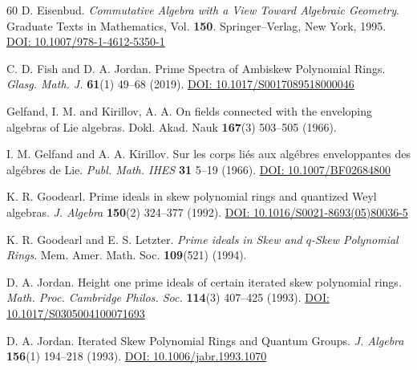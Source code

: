 \documentclass{amsart}
\theoremstyle{definition}
\theoremstyle{remark}
\numberwithin{equation}{section}
\begin{document}
\begin{thebibliography}{60}
 D. Eisenbud. {\em Commutative Algebra with a View Toward Algebraic Geometry}. Graduate Texts in Mathematics, Vol. {\bf 150}. Springer--Verlag, New York, 1995. \href{https://doi.org/10.1007/978-1-4612-5350-1}{DOI: 10.1007/978-1-4612-5350-1}


 C. D. Fish and D. A. Jordan. Prime Spectra of Ambiskew Polynomial Rings. {\em Glasg. Math. J.} {\bf 61}(1) 49--68 (2019). \href{https://doi.org/10.1017/S0017089518000046}{DOI: 10.1017/S0017089518000046}

 Gelfand, I. M. and Kirillov, A. A. On fields connected with the enveloping algebras of {L}ie algebras. Dokl. Akad. Nauk {\bf 167}(3) 503--505 (1966).

 I. M. Gelfand and A. A. Kirillov. Sur les corps li\'es aux alg\'ebres enveloppantes des alg\'ebres de Lie. {\em Publ. Math. IHES} {\bf 31} 5--19 (1966). \href{https://doi.org/10.1007/BF02684800}{DOI: 10.1007/BF02684800}

 K. R. Goodearl. Prime ideals in skew polynomial rings and quantized Weyl algebras. {\em J. Algebra} {\bf 150}(2) 324--377 (1992). \href{https://doi.org/10.1016/S0021-8693(05)80036-5}{DOI: 10.1016/S0021-8693(05)80036-5}

 K. R. Goodearl and E. S. Letzter. {\em Prime ideals in Skew and $q$-Skew Polynomial Rings}. Mem. Amer. Math. Soc. {\bf 109}(521) (1994).


 D. A. Jordan. Height one prime ideals of certain iterated skew polynomial rings. {\em Math. Proc. Cambridge Philos. Soc.} {\bf 114}(3) 407--425 (1993). \href{https://doi.org/10.1017/S0305004100071693}{DOI: 10.1017/S0305004100071693}

 D. A. Jordan. Iterated Skew Polynomial Rings and Quantum Groups. {\em J. Algebra} {\bf 156}(1) 194--218 (1993). \href{https://doi.org/10.1006/jabr.1993.1070}{DOI: 10.1006/jabr.1993.1070}


\end{thebibliography}
\end{document}
